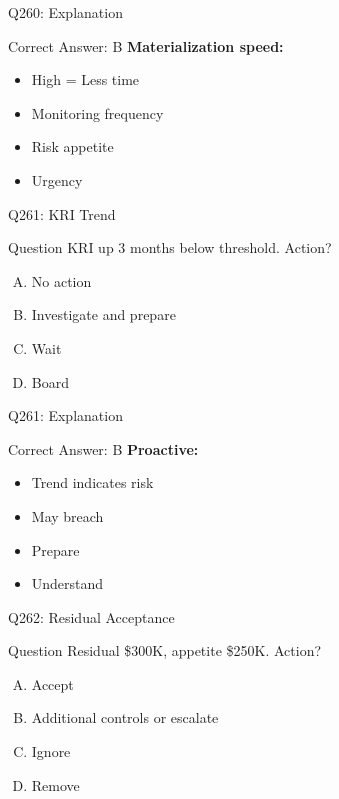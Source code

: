 \documentclass{beamer}
\begin{document}
	\begin{frame}{Q260: Explanation}
		\begin{block}{Correct Answer: B}
			\textbf{Materialization speed:}
			\begin{itemize}
				\item High = Less time
				\item Monitoring frequency
				\item Risk appetite
				\item Urgency
			\end{itemize}
		\end{block}
	\end{frame}
	
	\begin{frame}{Q261: KRI Trend}
		\begin{block}{Question}
			KRI up 3 months below threshold. Action?
		\end{block}
		\begin{enumerate}[(A)]
			\item No action
			\item Investigate and prepare
			\item Wait
			\item Board
		\end{enumerate}
	\end{frame}
	
	\begin{frame}{Q261: Explanation}
		\begin{block}{Correct Answer: B}
			\textbf{Proactive:}
			\begin{itemize}
				\item Trend indicates risk
				\item May breach
				\item Prepare
				\item Understand
			\end{itemize}
		\end{block}
	\end{frame}
	
	\begin{frame}{Q262: Residual Acceptance}
		\begin{block}{Question}
			Residual \$300K, appetite \$250K. Action?
		\end{block}
		\begin{enumerate}[(A)]
			\item Accept
			\item Additional controls or escalate
			\item Ignore
			\item Remove
		\end{enumerate}
	\end{frame}
	
\end{document}
